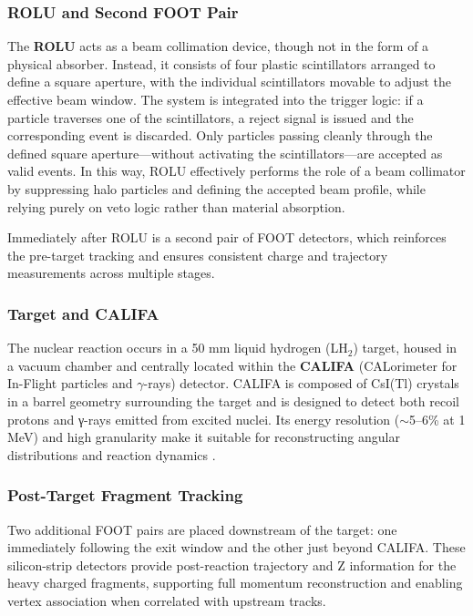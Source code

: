 \subsubsection{ROLU and Second FOOT Pair}

The \textbf{ROLU} acts as a beam collimation device, though not in the form of a physical absorber. Instead, it consists of four plastic scintillators arranged to define a square aperture, with the individual scintillators movable to adjust the effective beam window. The system is integrated into the trigger logic: if a particle traverses one of the scintillators, a reject signal is issued and the corresponding event is discarded. Only particles passing cleanly through the defined square aperture—without activating the scintillators—are accepted as valid events. In this way, ROLU effectively performs the role of a beam collimator by suppressing halo particles and defining the accepted beam profile, while relying purely on veto logic rather than material absorption.

Immediately after ROLU is a second pair of FOOT detectors, which reinforces the pre-target tracking and ensures consistent charge and trajectory measurements across multiple stages.

\subsubsection{Target and CALIFA}

The nuclear reaction occurs in a 50 mm liquid hydrogen (LH$_2$) target, housed in a vacuum chamber and centrally located within the \textbf{CALIFA} (CALorimeter for In-Flight particles and $\gamma$-rays) detector. CALIFA is composed of CsI(Tl) crystals in a barrel geometry surrounding the target and is designed to detect both recoil protons and γ-rays emitted from excited nuclei. Its energy resolution ($\sim$5–6\% at 1 MeV) and high granularity make it suitable for reconstructing angular distributions and reaction dynamics \cite{cortina-gil_califa_2014}.

\subsubsection{Post-Target Fragment Tracking}

Two additional FOOT pairs are placed downstream of the target: one immediately following the exit window and the other just beyond CALIFA. These silicon-strip detectors provide post-reaction trajectory and Z information for the heavy charged fragments, supporting full momentum reconstruction and enabling vertex association when correlated with upstream tracks.



